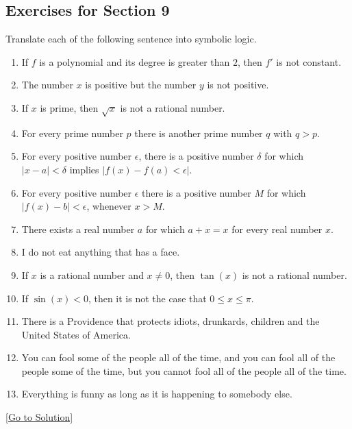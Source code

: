 \subsection{Exercises for Section 9}
\begin{exercise}\label{ex:2.19.1}
    Translate each of the following sentence into symbolic logic. 
    \begin{enumerate}
        \item If $f$ is a polynomial and its degree is greater than $2$, then $f'$ is not constant. 
        \item The number $x$ is positive but the number $y$ is not positive. 
        \item If $x$ is prime, then $\sqrt{x}$ is not a rational number. 
        \item For every prime number $p$ there is another prime number $q$ with $q>p$.
        \item For every positive number $\epsilon$, there is a positive number $\delta$ for which $\lvert x-a \rvert<\delta$ implies $\lvert f(x)-f(a)<\epsilon \rvert$. 
        \item For every positive number $\epsilon$ there is a positive number $M$ for which $\lvert f(x)-b \rvert<\epsilon$, whenever $x>M$. 
        \item There exists a real number $a$ for which $a+x=x$ for every real number $x$. 
        \item I do not eat anything that has a face. 
        \item If $x$ is a rational number and $x\ne 0$, then $\tan(x)$ is not a rational number. 
        \item If $\sin(x)<0$, then it is not the case that $0\le x\le \pi$.
        \item There is a Providence that protects idiots, drunkards, children and the United States of America. 
        \item You can fool some of the people all of the time, and you can fool all of the people some of the time, but you cannot fool all of the people all of the time. 
        \item Everything is funny as long as it is happening to somebody else. 
    \end{enumerate}
\end{exercise}\hyperref[sol:2.19.1]{[Go to Solution]}